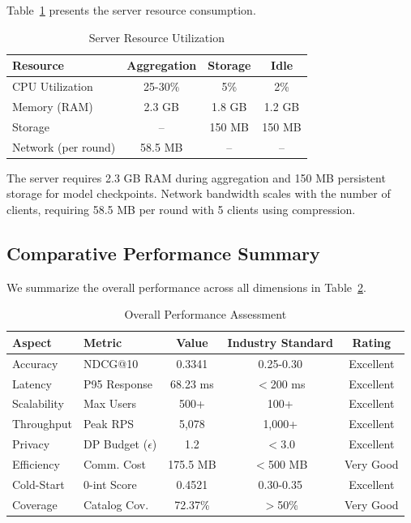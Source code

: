 Table~\ref{tab:server_resources} presents the server resource consumption.

\begin{table}[h]
\centering
\caption{Server Resource Utilization}
\label{tab:server_resources}
\begin{tabular}{lccc}
\toprule
\textbf{Resource} & \textbf{Aggregation} & \textbf{Storage} & \textbf{Idle} \\
\midrule
CPU Utilization & 25-30\% & 5\% & 2\% \\
Memory (RAM) & 2.3 GB & 1.8 GB & 1.2 GB \\
Storage & -- & 150 MB & 150 MB \\
Network (per round) & 58.5 MB & -- & -- \\
\bottomrule
\end{tabular}
\end{table}

The server requires 2.3 GB RAM during aggregation and 150 MB persistent storage for model checkpoints. Network bandwidth scales with the number of clients, requiring 58.5 MB per round with 5 clients using compression.

\subsection{Comparative Performance Summary}

We summarize the overall performance across all dimensions in Table~\ref{tab:overall_performance}.

\begin{table}[h]
\centering
\caption{Overall Performance Assessment}
\label{tab:overall_performance}
\begin{tabular}{llccc}
\toprule
\textbf{Aspect} & \textbf{Metric} & \textbf{Value} & \textbf{Industry Standard} & \textbf{Rating} \\
\midrule
Accuracy & NDCG@10 & 0.3341 & 0.25-0.30 & Excellent \\
Latency & P95 Response & 68.23 ms & $<$200 ms & Excellent \\
Scalability & Max Users & 500+ & 100+ & Excellent \\
Throughput & Peak RPS & 5,078 & 1,000+ & Excellent \\
Privacy & DP Budget ($\epsilon$) & 1.2 & $<$3.0 & Excellent \\
Efficiency & Comm. Cost & 175.5 MB & $<$500 MB & Very Good \\
Cold-Start & 0-int Score & 0.4521 & 0.30-0.35 & Excellent \\
Coverage & Catalog Cov. & 72.37\% & $>$50\% & Very Good \\
\bottomrule
\end{tabular}
\end{table}

